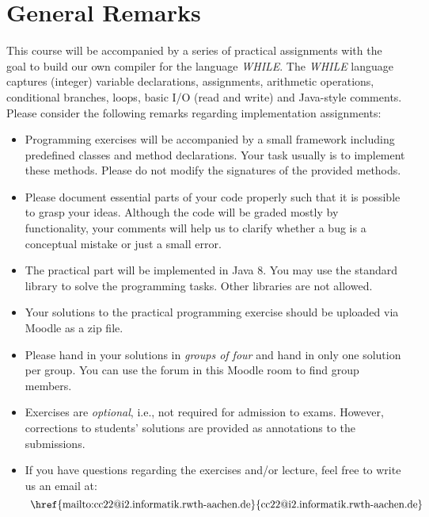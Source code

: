 \documentclass[a4paper]{article}
\begin{document}

\section*{General Remarks}
This course will be accompanied by a series of practical assignments with the goal to build our own compiler \icompiler{} for the language \textit{WHILE}.
The \textit{WHILE} language captures (integer) variable declarations, assignments, arithmetic operations, conditional branches, loops, basic I/O (read and write) and Java-style comments.
Please consider the following remarks regarding implementation assignments:
\begin{itemize}
  \item Programming exercises will be accompanied by a small framework including predefined classes and method declarations. Your task usually is to implement these methods. Please do not modify the signatures of the provided methods.
  \item Please document essential parts of your code properly such that it is possible to grasp your ideas. Although the code will be graded mostly by functionality, your comments will help us to clarify whether a bug is a conceptual mistake or just a small error.
  \item The practical part will be implemented in Java 8. You may use the standard library to solve the programming tasks. Other libraries are not allowed.
  \item Your solutions to the practical programming exercise should be uploaded via Moodle as a zip file.
  \item Please hand in your solutions in \emph{groups of four} and hand in only one solution per group. You can use the forum in this Moodle room to find group members.
  \item Exercises are \emph{optional}, i.e., not required for admission to exams. However, corrections to students’ solutions are provided as annotations to the submissions.
  \item If you have questions regarding the exercises and/or lecture, feel free to write us an email at:
  \[\text{   \href{mailto:cc22@i2.informatik.rwth-aachen.de}{cc22@i2.informatik.rwth-aachen.de}}\]
\end{itemize}
\end{document}
